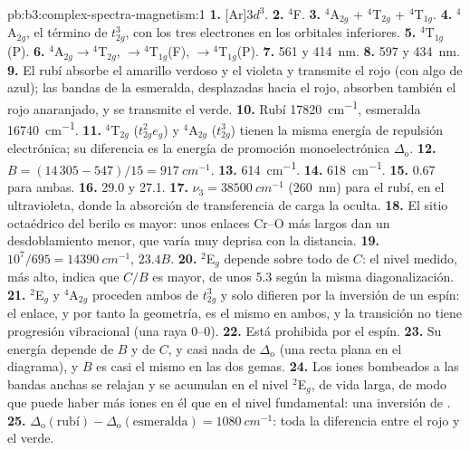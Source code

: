 \begin{solution}{pb:b3:complex-spectra-magnetism:1}
\textbf{1.} [Ar]$3d^3$.
\textbf{2.} $^4$F.
\textbf{3.} $^4$A$_{2g}$ + $^4$T$_{2g}$ + $^4$T$_{1g}$.
\textbf{4.} $^4$A$_{2g}$, el término de $t_{2g}^3$, con los tres electrones en los orbitales inferiores.
\textbf{5.} $^4$T$_{1g}$(P).
\textbf{6.} $^4$A$_{2g}\to{}^4$T$_{2g}$, $\to{}^4$T$_{1g}$(F), $\to{}^4$T$_{1g}$(P).
\textbf{7.} 561 y \qty{414}{nm}.
\textbf{8.} 597 y \qty{434}{nm}.
\textbf{9.} El rubí absorbe el amarillo verdoso y el violeta y transmite el rojo (con algo
de azul); las bandas de la esmeralda, desplazadas hacia el rojo, absorben también el rojo anaranjado, y se
transmite el verde.
\textbf{10.} Rubí \qty{17820}{cm^{-1}}, esmeralda \qty{16740}{cm^{-1}}.
\textbf{11.} $^4$T$_{2g}$ ($t_{2g}^2e_g$) y $^4$A$_{2g}$ ($t_{2g}^3$) tienen la misma energía de repulsión electrónica; su
diferencia es la energía de promoción monoelectrónica $\Delta_{\mathrm o}$.
\textbf{12.} $B = (14\,305 - 547)/15 = \qty{917}{cm^{-1}}$.
\textbf{13.} \qty{614}{cm^{-1}}.
\textbf{14.} \qty{618}{cm^{-1}}.
\textbf{15.} 0.67 para ambas.
\textbf{16.} 29.0 y 27.1.
\textbf{17.} $\nu_3 = \qty{38500}{cm^{-1}}$ (\qty{260}{nm}) para el rubí, en el ultravioleta, donde la absorción de
transferencia de carga la oculta.
\textbf{18.} El sitio octaédrico del berilo es mayor: unos enlaces Cr--O más largos dan un
desdoblamiento menor, que varía muy deprisa con la distancia.
\textbf{19.} $10^7/695 = \qty{14390}{cm^{-1}}$, $23.4B$.
\textbf{20.} $^2$E$_g$ depende sobre todo de $C$: el nivel medido, más alto, indica que $C/B$ es mayor,
de unos 5.3 según la misma diagonalización.
\textbf{21.} $^2$E$_g$ y $^4$A$_{2g}$ proceden ambos de $t_{2g}^3$ y solo difieren por la inversión de un espín: el enlace,
y por tanto la geometría, es el mismo en ambos, y la transición no tiene progresión
vibracional (una raya 0--0).
\textbf{22.} Está prohibida por el espín.
\textbf{23.} Su energía depende de $B$ y de $C$, y casi nada de $\Delta_{\mathrm o}$ (una recta plana en el diagrama),
y $B$ es casi el mismo en las dos gemas.
\textbf{24.} Los iones bombeados a las bandas anchas se relajan y se acumulan en el nivel
$^2$E$_g$, de vida larga, de modo que puede haber más iones en él que en el nivel fundamental: una inversión de
.
\textbf{25.} \textbf{$\Delta_{\mathrm o}(\text{rubí}) - \Delta_{\mathrm o}(\text{esmeralda}) = \qty{1080}{cm^{-1}}$}: toda la diferencia entre el rojo y el
verde.
\end{solution}
